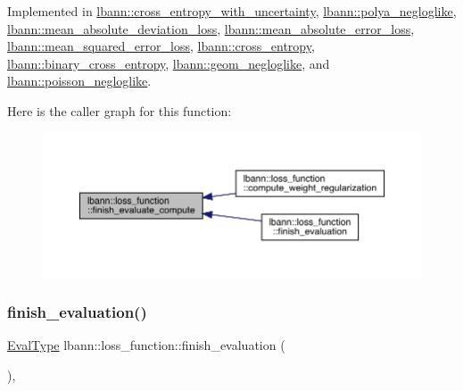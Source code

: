 Implemented in \hyperlink{classlbann_1_1cross__entropy__with__uncertainty_abb9b240766b395dab052e3225a0888f6}{lbann\+::cross\+\_\+entropy\+\_\+with\+\_\+uncertainty}, \hyperlink{classlbann_1_1polya__negloglike_a81dbe71fef52ee0874549c4cf96c01e3}{lbann\+::polya\+\_\+negloglike}, \hyperlink{classlbann_1_1mean__absolute__deviation__loss_ab0a19f6393ef5df9275f1ed4802e8cf6}{lbann\+::mean\+\_\+absolute\+\_\+deviation\+\_\+loss}, \hyperlink{classlbann_1_1mean__absolute__error__loss_a0b6518199e86abc197e811f0a1ff7868}{lbann\+::mean\+\_\+absolute\+\_\+error\+\_\+loss}, \hyperlink{classlbann_1_1mean__squared__error__loss_a5486b4e6d6b6fbfdd6fdd381f7cbd7eb}{lbann\+::mean\+\_\+squared\+\_\+error\+\_\+loss}, \hyperlink{classlbann_1_1cross__entropy_a85d6937dc70217062f7b45cb678ea1f9}{lbann\+::cross\+\_\+entropy}, \hyperlink{classlbann_1_1binary__cross__entropy_acedb440a94926866c4de4fdeeb5165bd}{lbann\+::binary\+\_\+cross\+\_\+entropy}, \hyperlink{classlbann_1_1geom__negloglike_a320ac2f029e0a43640878bc052bf5299}{lbann\+::geom\+\_\+negloglike}, and \hyperlink{classlbann_1_1poisson__negloglike_a67c3cb239905fa9ee57369dddbbe76ed}{lbann\+::poisson\+\_\+negloglike}.

Here is the caller graph for this function\+:\nopagebreak
\begin{figure}[H]
\begin{center}
\leavevmode
\includegraphics[width=350pt]{classlbann_1_1loss__function_a3ea8553a4e9c75477d7d4fc533c4d4fd_icgraph}
\end{center}
\end{figure}
\mbox{\label{classlbann_1_1loss__function_a5264d3e71125b7ce8694f73bf25662f7}} 
\subsubsection{\texorpdfstring{finish\+\_\+evaluation()}{finish\_evaluation()}}
{\footnotesize\ttfamily \hyperlink{base_8hpp_a3266f5ac18504bbadea983c109566867}{Eval\+Type} lbann\+::loss\+\_\+function\+::finish\+\_\+evaluation (\begin{DoxyParamCaption}{ }\end{DoxyParamCaption})\hspace{0.3cm}{\ttfamily [override]}, {\ttfamily [virtual]}}

